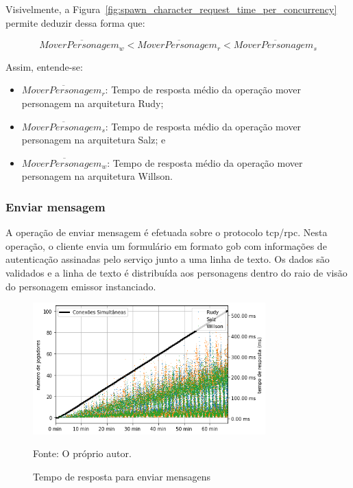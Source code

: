 Visivelmente, a Figura~\ref{fig:spawn_character_request_time_per_concurrency} permite deduzir dessa forma que:

$$
  \overline{MoverPersonagem_{w}} < \overline{MoverPersonagem_{r}} <\overline{MoverPersonagem_{s}}
$$

Assim, entende-se:

\begin{itemize}
 \item $\overline{MoverPersonagem_{r}}$: Tempo de resposta médio da operação mover personagem na arquitetura Rudy;
 \item $\overline{MoverPersonagem_{s}}$: Tempo de resposta médio da operação mover personagem na arquitetura Salz; e
 \item $\overline{MoverPersonagem_{w}}$: Tempo de resposta médio da operação mover personagem na arquitetura Willson.
\end{itemize}


\subsubsection{Enviar mensagem}

A operação de enviar mensagem é efetuada sobre o protocolo \ac{tcp}/\ac{rpc}.
%
Nesta operação, o cliente envia um formulário em formato \ac{gob} com informações de autenticação assinadas pelo serviço junto a uma linha de texto.
%
Os dados são validados e a linha de texto é distribuída aos personagens dentro do raio de visão do personagem emissor instanciado.

\begin{figure}[htb!]
  \caption{Tempo de resposta para enviar mensagens}
  \label{fig:send_chat_request_time}
  \includegraphics[width=0.8\textwidth]{figuras/analise/rt/send_chat_request_time}
  \centering

  Fonte: O próprio autor.
\end{figure}

